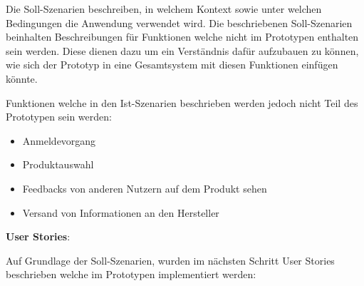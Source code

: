 Die Soll-Szenarien beschreiben, in welchem Kontext sowie unter welchen Bedingungen die Anwendung verwendet wird. Die beschriebenen Soll-Szenarien beinhalten Beschreibungen für Funktionen welche nicht 
im Prototypen enthalten sein werden. Diese dienen dazu um ein Verständnis dafür aufzubauen zu können, wie sich der Prototyp in eine Gesamtsystem mit diesen Funktionen einfügen könnte. 

Funktionen welche in den Ist-Szenarien beschrieben werden jedoch nicht Teil des Prototypen sein werden: 

\begin{itemize}
\item{Anmeldevorgang} 
\item{Produktauswahl} 
\item{Feedbacks von anderen Nutzern auf dem Produkt sehen}
\item{Versand von Informationen an den Hersteller}
\end{itemize}


\textbf{User Stories}:

Auf Grundlage der Soll-Szenarien, wurden im nächsten Schritt User Stories beschrieben welche im Prototypen implementiert werden: 


